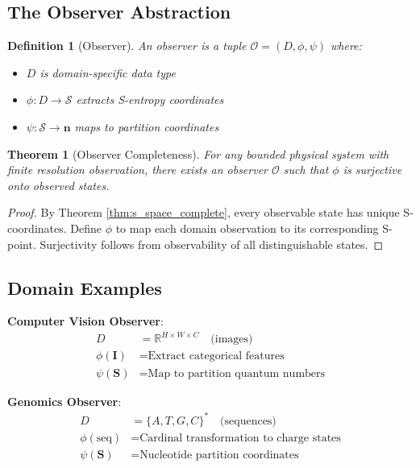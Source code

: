 \documentclass[twocolumn,10pt]{article}
\newtheorem{theorem}{Theorem}
\newtheorem{definition}{Definition}
\begin{document}
\subsection{The Observer Abstraction}

\begin{definition}[Observer]
An observer is a tuple $\mathcal{O} = (D, \phi, \psi)$ where:
\begin{itemize}
\item $D$ is domain-specific data type
\item $\phi: D \to \mathcal{S}$ extracts S-entropy coordinates
\item $\psi: \mathcal{S} \to \mathbf{n}$ maps to partition coordinates
\end{itemize}
\end{definition}

\begin{theorem}[Observer Completeness]
For any bounded physical system with finite resolution observation, there exists an observer $\mathcal{O}$ such that $\phi$ is surjective onto observed states.
\end{theorem}

\begin{proof}
By Theorem \ref{thm:s_space_complete}, every observable state has unique S-coordinates. Define $\phi$ to map each domain observation to its corresponding S-point. Surjectivity follows from observability of all distinguishable states.
\end{proof}

\subsection{Domain Examples}

\textbf{Computer Vision Observer}:
\begin{align}
D &= \mathbb{R}^{H \times W \times C} \quad \text{(images)} \\
\phi(\mathbf{I}) &= \text{Extract categorical features} \\
\psi(\mathbf{S}) &= \text{Map to partition quantum numbers}
\end{align}

\textbf{Genomics Observer}:
\begin{align}
D &= \{A, T, G, C\}^* \quad \text{(sequences)} \\
\phi(\text{seq}) &= \text{Cardinal transformation to charge states} \\
\psi(\mathbf{S}) &= \text{Nucleotide partition coordinates}
\end{align}
\end{document}
